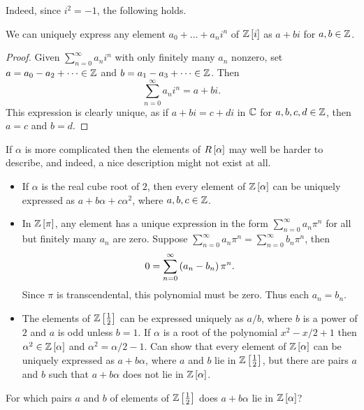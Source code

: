 Indeed, since $ i^2 = -1 $, the following holds.

\begin{proposition}
We can uniquely express any element $ a_0 + \dots + a_ni^n $ of $ \ZZ\sbr{i} $ as $ a + bi $ for $ a, b \in \mathbb{Z} $.
\end{proposition}

\begin{proof}
Given $ \sum_{n = 0}^\infty a_ni^n $ with only finitely many $ a_n $ nonzero, set $ a = a_0 - a_2 + \dots \in \mathbb{Z} $ and $ b = a_1 - a_3 + \dots \in \mathbb{Z} $. Then
$$ \sum_{n = 0}^\infty a_ni^n = a + bi. $$
This expression is clearly unique, as if $ a + bi = c + di $ in $ \mathbb{C} $ for $ a, b, c, d \in \mathbb{Z} $, then $ a = c $ and $ b = d $.
\end{proof}

If $ \alpha $ is more complicated then the elements of $ R\sbr{\alpha} $ may well be harder to describe, and indeed, a nice description might not exist at all.

\begin{example*}
\hfill
\begin{itemize}
\item If $ \alpha $ is the real cube root of $ 2 $, then every element of $ \ZZ\sbr{\alpha} $ can be uniquely expressed as $ a + b\alpha + c\alpha^2 $, where $ a, b, c \in \mathbb{Z} $.
\item In $ \ZZ\sbr{\pi} $, any element has a unique expression in the form $ \sum_{n = 0}^\infty a_n\pi^n $ for all but finitely many $ a_n $ are zero. Suppose $ \sum_{n = 0}^\infty a_n\pi^n = \sum_{n = 0}^\infty b_n\pi^n $, then
$$ 0 = \sum_{n = 0}^\infty \br{a_n - b_n}\pi^n. $$
Since $ \pi $ is transcendental, this polynomial must be zero. Thus each $ a_n = b_n $.
\item The elements of $ \ZZ\sbr{\tfrac{1}{2}} $ can be expressed uniquely as $ a / b $, where $ b $ is a power of $ 2 $ and $ a $ is odd unless $ b = 1 $. If $ \alpha $ is a root of the polynomial $ x^2 - x / 2 + 1 $ then $ \alpha^2 \in \ZZ\sbr{\alpha} $ and $ \alpha^2 = \alpha / 2 - 1 $. Can show that every element of $ \ZZ\sbr{\alpha} $ can be uniquely expressed as $ a + b\alpha $, where $ a $ and $ b $ lie in $ \ZZ\sbr{\tfrac{1}{2}} $, but there are pairs $ a $ and $ b $ such that $ a + b\alpha $ does not lie in $ \ZZ\sbr{\alpha} $.
\end{itemize}
\end{example*}

\begin{exercise*}
For which pairs $ a $ and $ b $ of elements of $ \ZZ\sbr{\tfrac{1}{2}} $ does $ a + b\alpha $ lie in $ \ZZ\sbr{\alpha} $?
\end{exercise*}

